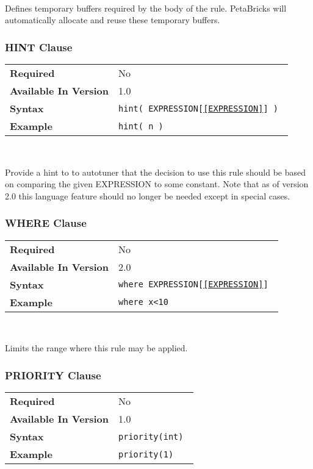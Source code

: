 \documentclass[11pt]{article}
\begin{document}
~

\noindent Defines temporary buffers required by the body of the rule.
PetaBricks will automatically allocate and reuse these temporary buffers.

\subsubsection{HINT Clause}
\begin{tabular}{| l | l |}
\hline
\bf Required & No \\
\bf Available In Version & 1.0             \\
\bf Syntax & \tt hint( EXPRESSION[\ref{EXPRESSION}] )   \\
\bf Example & \tt hint( n )           \\
\hline
\end{tabular}

~

\noindent Provide a hint to to autotuner that the decision to use this
rule should be based on comparing the given EXPRESSION to some constant.
Note that as of version 2.0 this language feature should no longer be needed
except in special cases.


\subsubsection{WHERE Clause}
\begin{tabular}{| l | l |}
\hline
\bf Required & No                          \\
\bf Available In Version & 2.0             \\
\bf Syntax & \tt where EXPRESSION[\ref{EXPRESSION}] \\
\bf Example & \tt where x<10               \\
\hline
\end{tabular}

~

\noindent Limits the range where this rule may be applied.

\subsubsection{PRIORITY Clause}
\begin{tabular}{| l | l |}
\hline
\bf Required & No                          \\
\bf Available In Version & 1.0             \\
\bf Syntax & \tt priority(int)             \\
\bf Example & \tt priority(1)              \\
\hline
\end{tabular}
\end{document}
